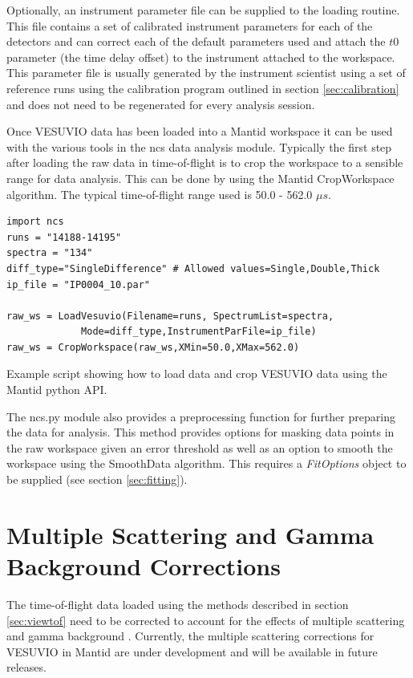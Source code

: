 \documentclass[paper=a4, fontsize=11pt]{scrartcl}	%
\numberwithin{equation}{section}															%
\numberwithin{figure}{section}																%
\numberwithin{table}{section}
\begin{document}
Optionally, an instrument parameter file can be supplied to the loading routine. This file contains a set of calibrated instrument parameters for each of the detectors and can correct each of the default parameters used and attach the $t0$ parameter (the time delay offset)\cite{mayers2011calibration} to the instrument attached to the workspace. This parameter file is usually generated by the instrument scientist using a set of reference runs using the calibration program outlined in section \ref{sec:calibration} and does not need to be regenerated for every analysis session. 

Once VESUVIO data has been loaded into a Mantid workspace it can be used with the various tools in the ncs data analysis module. Typically the first step after loading the raw data in time-of-flight is to crop the workspace to a sensible range for data analysis. This can be done by using the Mantid CropWorkspace algorithm. The typical time-of-flight range used is 50.0 - 562.0 $\mu s$.

\begin{listing}[H]
\begin{verbatim}
import ncs
runs = "14188-14195"
spectra = "134"
diff_type="SingleDifference" # Allowed values=Single,Double,Thick
ip_file = "IP0004_10.par"

raw_ws = LoadVesuvio(Filename=runs, SpectrumList=spectra,
		     Mode=diff_type,InstrumentParFile=ip_file)
raw_ws = CropWorkspace(raw_ws,XMin=50.0,XMax=562.0)
\end{verbatim}
\caption{Example script showing how to load data and crop VESUVIO data using the Mantid python API.}
\label{lst:loading-data}
\end{listing}

The ncs.py module also provides a preprocessing function for further preparing the data for analysis. This method provides options for masking data points in the raw workspace given an error threshold as well as an option to smooth the workspace using the SmoothData algorithm. This requires a \textit{FitOptions} object to be supplied (see section \ref{sec:fitting}).

\section{Multiple Scattering and Gamma Background Corrections}
\label{sec:corrections}
The time-of-flight data loaded using the methods described in section \ref{sec:viewtof} need to be corrected to account for the effects of multiple scattering \citep{mayers2002multiple} and gamma background \citep{mayers2011calculation}. Currently, the multiple scattering corrections for VESUVIO in Mantid are under development and will be available in future releases.
\end{document}
